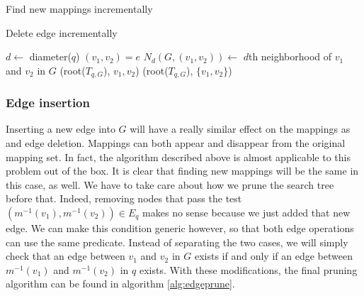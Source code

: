 \begin{algorithm}[ht]
    \caption{Find new mappings incrementally}
    \label{alg:deledgefind}
    \SetAlgoLined\DontPrintSemicolon    
    
\end{algorithm}

\begin{algorithm}[ht]
    \caption{Delete edge incrementally}
    \label{alg:deledge}
    \SetAlgoLined\DontPrintSemicolon    
    
    \nl $d \gets $ diameter($q$)\;
    \nl $(v_1, v_2) = e$\;
    \nl $N_d(G, (v_1, v_2)) \gets$ $d$th neighborhood of $v_1$ and $v_2$ in $G$\;
    \nl \prune(root($T_{q, G}$), $v_1, v_2$)\;
    \nl \find(root($T_{q, G}$), $\{v_1, v_2\}$)\;        
\end{algorithm}


\subsubsection{Edge insertion}

Inserting a new edge into $G$ will have a really similar effect on the mappings as and edge
deletion. Mappings can both appear and disappear from the original mapping set. In fact, the
algorithm described above is almost applicable to this problem out of the box. It is clear 
that finding new mappings will be the same in this case, as well. We have to take care about
how we prune the search tree before that. Indeed, removing nodes that pass the test 
$(m^{-1}(v_1), m^{-1}(v_2)) \in E_q$ makes no sense because we just added that new edge. We
can make this condition generic however, so that both edge operations can use the same predicate.
Instead of separating the two cases, we will simply check that an edge between $v_1$ and $v_2$
in $G$ exists if and only if an edge between $m^{-1}(v_1)$ and $m^{-1}(v_2)$ in $q$ exists.
With these modifications, the final pruning algorithm can be found in algorithm \ref{alg:edgeprune}.

